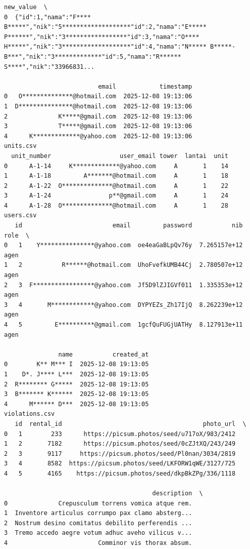 \begin{lstlisting}[caption={Output 10}]
                                           new_value  \
0  {"id":1,"nama":"F**** B*****","nik":"5*******************"id":2,"nama":"E***** P******","nik":"3*****************"id":3,"nama":"O**** H*****","nik":"3*******************"id":4,"nama":"N***** B*****-B***","nik":"3*************"id":5,"nama":"R****** S****","nik":"33966831...   

                          email            timestamp  
0   O**************@hotmail.com  2025-12-08 19:13:06  
1  D***************@hotmail.com  2025-12-08 19:13:06  
2              K*****@gmail.com  2025-12-08 19:13:06  
3              T*****@gmail.com  2025-12-08 19:13:06  
4      K*************@yahoo.com  2025-12-08 19:13:06  
units.csv
  unit_number                   user_email tower  lantai  unit
0      A-1-14     K*************@yahoo.com     A       1    14
1      A-1-18         A*******@hotmail.com     A       1    18
2      A-1-22  O**************@hotmail.com     A       1    22
3      A-1-24                p**@gmail.com     A       1    24
4      A-1-28  O**************@hotmail.com     A       1    28
users.csv
   id                         email         password           nib  role  \
0   1    Y***************@yahoo.com  oe4eaGaBLpQv76y  7.265157e+12  agen   
1   2           R******@hotmail.com  UhoFvefkUMB44Cj  2.780507e+12  agen   
2   3  F*****************@yahoo.com  Jf5D9lZJIGVf011  1.335353e+12  agen   
3   4       M************@yahoo.com  DYPYEZs_Zh17IjQ  8.262239e+12  agen   
4   5         E**********@gmail.com  1gcfQuFUGjUATHy  8.127913e+11  agen   

               name           created_at  
0        K** M*** I  2025-12-08 19:13:05  
1    D*. J**** L***  2025-12-08 19:13:05  
2  R******** G*****  2025-12-08 19:13:05  
3  B******* K******  2025-12-08 19:13:05  
4      M****** D***  2025-12-08 19:13:05  
violations.csv
   id  rental_id                                       photo_url  \
0   1        233      https://picsum.photos/seed/u717oX/983/2412   
1   2       7182      https://picsum.photos/seed/0cZJtXQ/243/249   
2   3       9117     https://picsum.photos/seed/Pl0nan/3034/2819   
3   4       8582  https://picsum.photos/seed/LKFORW1qWE/3127/725   
4   5       4165    https://picsum.photos/seed/dkpBkZPg/336/1118   

                                         description  \
0              Crepusculum torrens vomica atque rem.   
1  Inventore articulus corrumpo pax clamo absterg...   
2  Nostrum desino comitatus debilito perferendis ...   
3  Tremo accedo aegre votum adhuc aveho vilicus v...   
4                         Comminor vis thorax absum.   


\end{lstlisting}
